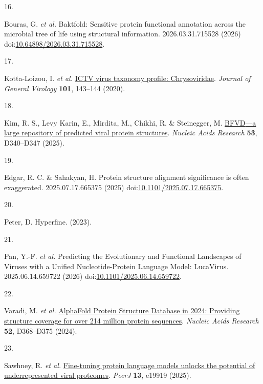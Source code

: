 \documentclass[
  sn-nature,
]{sn-jnl}
\newlength{\cslhangindent}
\newlength{\csllabelwidth}
\newenvironment{CSLReferences}[2] %
 {\begin{list}{}{%
  \setlength{\itemindent}{0pt}
  \setlength{\leftmargin}{0pt}
  \setlength{\parsep}{0pt}
  \ifodd #1
   \setlength{\leftmargin}{\cslhangindent}
   \setlength{\itemindent}{-1\cslhangindent}
  \fi
  \setlength{\itemsep}{#2\baselineskip}}}
 {\end{list}}
\newcommand{\CSLLeftMargin}[1]{\parbox[t]{\csllabelwidth}{\strut#1\strut}}
\newcommand{\CSLRightInline}[1]{\parbox[t]{\linewidth - \csllabelwidth}{\strut#1\strut}}
\begin{document}
\begin{CSLReferences}{0}{0}
\CSLLeftMargin{16. }%
\CSLRightInline{Bouras, G. \emph{et al.} Baktfold: {Sensitive} protein
functional annotation across the microbial tree of life using structural
information. 2026.03.31.715528 (2026)
doi:\href{https://doi.org/10.64898/2026.03.31.715528}{10.64898/2026.03.31.715528}.}

\CSLLeftMargin{17. }%
\CSLRightInline{Kotta-Loizou, I. \emph{et al.}
\href{https://doi.org/10.1099/JGV.0.001383/CITE/REFWORKS}{{ICTV} virus
taxonomy profile: {Chrysoviridae}}. \emph{Journal of General Virology}
\textbf{101}, 143--144 (2020).}

\CSLLeftMargin{18. }%
\CSLRightInline{Kim, R. S., Levy Karin, E., Mirdita, M., Chikhi, R. \&
Steinegger, M. \href{https://doi.org/10.1093/nar/gkae1119}{{BFVD}---a
large repository of predicted viral protein structures}. \emph{Nucleic
Acids Research} \textbf{53}, D340--D347 (2025).}

\CSLLeftMargin{19. }%
\CSLRightInline{Edgar, R. C. \& Sahakyan, H. Protein structure alignment
significance is often exaggerated. 2025.07.17.665375 (2025)
doi:\href{https://doi.org/10.1101/2025.07.17.665375}{10.1101/2025.07.17.665375}.}

\CSLLeftMargin{20. }%
\CSLRightInline{Peter, D. Hyperfine. (2023).}

\CSLLeftMargin{21. }%
\CSLRightInline{Pan, Y.-F. \emph{et al.} Predicting the {Evolutionary}
and {Functional Landscapes} of {Viruses} with a {Unified
Nucleotide-Protein Language Model}: {LucaVirus}. 2025.06.14.659722
(2026)
doi:\href{https://doi.org/10.1101/2025.06.14.659722}{10.1101/2025.06.14.659722}.}

\CSLLeftMargin{22. }%
\CSLRightInline{Varadi, M. \emph{et al.}
\href{https://doi.org/10.1093/nar/gkad1011}{{AlphaFold Protein Structure
Database} in 2024: Providing structure coverage for over 214 million
protein sequences}. \emph{Nucleic Acids Research} \textbf{52},
D368--D375 (2024).}

\CSLLeftMargin{23. }%
\CSLRightInline{Sawhney, R. \emph{et al.}
\href{https://doi.org/10.7717/peerj.19919}{Fine-tuning protein language
models unlocks the potential of underrepresented viral proteomes}.
\emph{PeerJ} \textbf{13}, e19919 (2025).}


\end{CSLReferences}
\end{document}
